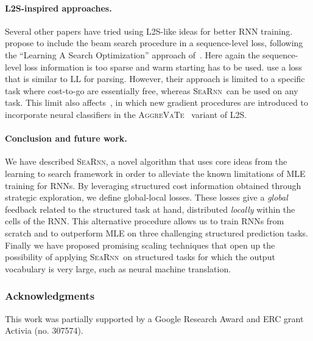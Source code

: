 \documentclass{article}
\newcommand{\SEARNN}{\textsc{SeaRnn}}
\begin{document}
	\vspace{-1mm}
	\paragraph{L2S-inspired approaches.}
	Several other papers have tried using L2S-like ideas for better RNN training.
	~\citet{Wiseman2016b} propose to include the beam search procedure in a sequence-level loss, following the ``Learning A Search Optimization'' approach of~\citet{Daume2005}.
	Here again the sequence-level loss information is too sparse and warm starting has to be used.
	\citet{Ballesteros2016b} use a loss that is similar to LL for parsing.
	However, their approach is limited to a specific task where cost-to-go are essentially free, whereas \SEARNN\ can be used on any task.
	This limit also affects~\citet{Sun2017}, in which new gradient procedures are introduced to incorporate neural classifiers in the \textsc{AggreVaTe}~\citep{Ross2014c} variant of L2S.

	\vspace{-1mm}
	\paragraph{Conclusion and future work.}
	We have described \SEARNN, a novel algorithm that uses core ideas from the learning to search framework in order to alleviate the known limitations of MLE training for RNNs.
    By leveraging structured cost information obtained through strategic exploration, we define global-local losses.
    These losses give a \emph{global} feedback related to the structured task at hand, distributed \emph{locally} within the cells of the RNN.
	This alternative procedure allows us to train RNNs from scratch and to outperform MLE on three challenging structured prediction tasks.
	Finally we have proposed promising scaling techniques that open up the possibility of applying \SEARNN\ on structured tasks for which the output vocabulary is very large, such as neural machine translation.

	
	\clearpage
	\subsubsection*{Acknowledgments}
	This work was partially supported by a Google Research Award and ERC grant Activia (no. 307574).\\

	{\small
	
	
}
	\clearpage
	\appendix
\end{document}
